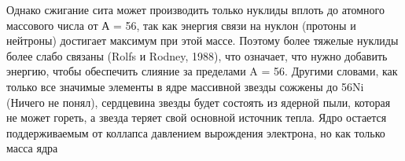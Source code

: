 \documentclass[%
bachelor,    %
natbib,      %
subf,        %
href,        %
colorlinks,  %
]{disser}
\begin{document}
Однако сжигание сита может производить только нуклиды вплоть до атомного массового числа от А = 56, так как энергия связи на нуклон (протоны и нейтроны) достигает максимум при этой массе. Поэтому более тяжелые нуклиды более слабо связаны (Rolfs и Rodney, 1988), что означает, что нужно добавить энергию, чтобы обеспечить слияние за пределами A = 56. Другими словами, как только все значимые элементы в ядре массивной звезды сожжены до 56Ni (Ничего не понял), сердцевина звезды будет состоять из ядерной пыли, которая не может гореть, а звезда теряет свой основной источник тепла. Ядро остается поддерживаемым от коллапса давлением вырождения электрона, но как только масса ядра


\end{document}

